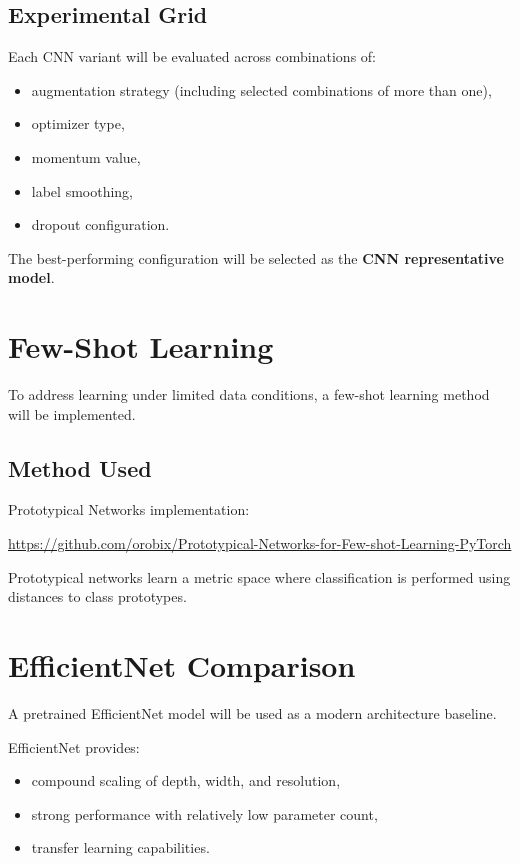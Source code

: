 \documentclass[11pt,a4paper]{article}
\begin{document}
\subsection{Experimental Grid}

Each CNN variant will be evaluated across combinations of:

\begin{itemize}
    \item augmentation strategy (including selected combinations of more than one),
    \item optimizer type,
    \item momentum value,
    \item label smoothing,
    \item dropout configuration.
\end{itemize}

The best-performing configuration will be selected as the \textbf{CNN representative model}.

\section{Few-Shot Learning}

To address learning under limited data conditions, a few-shot learning method will be implemented.

\subsection{Method Used}

Prototypical Networks implementation:

\begin{center}
\url{https://github.com/orobix/Prototypical-Networks-for-Few-shot-Learning-PyTorch}
\end{center}

Prototypical networks learn a metric space where classification is performed using distances to class prototypes.

\section{EfficientNet Comparison}

A pretrained EfficientNet model will be used as a modern architecture baseline.

EfficientNet provides:

\begin{itemize}
    \item compound scaling of depth, width, and resolution,
    \item strong performance with relatively low parameter count,
    \item transfer learning capabilities.
\end{itemize}
\end{document}
